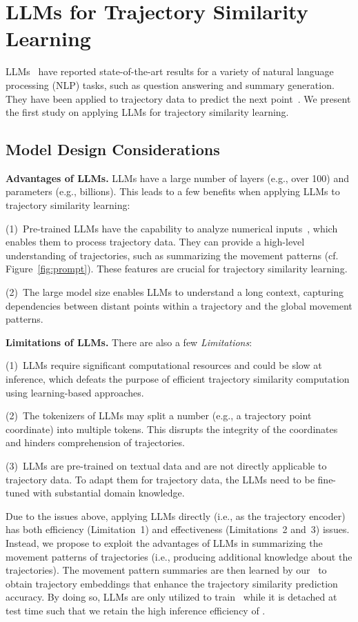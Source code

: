 \section{LLMs for Trajectory Similarity Learning}\label{sec:llm}
LLMs~\cite{gpt4,llama2,gemini,llama1} have reported state-of-the-art results for a variety of natural language processing (NLP) tasks, such as question answering and summary generation. They have been applied to trajectory data to predict the next point~\cite{llm4poi,trajllm}. We present the first study on applying LLMs for trajectory similarity learning.



\subsection{Model Design Considerations}\label{subsec:llm_discussion}
\textbf{Advantages of LLMs.} LLMs have a large number of layers (e.g., over 100) and parameters (e.g., billions). 
This leads to a few benefits when applying LLMs to trajectory similarity learning:
 
(1)~Pre-trained LLMs have the capability to analyze numerical inputs~\cite{timellm,lagllama}, which enables them to process trajectory data. They can provide a high-level understanding of trajectories, such as summarizing the movement patterns (cf. Figure~\ref{fig:prompt}). These features are crucial for trajectory similarity learning.

(2)~The large model size enables LLMs to understand a long context,  capturing dependencies between distant points within a trajectory and the global movement patterns.


\textbf{Limitations of LLMs.} There are also a few \emph{Limitations}:

(1)~LLMs require significant computational resources and could be slow at inference, which defeats the purpose of efficient trajectory similarity computation using learning-based approaches. 

(2)~The tokenizers of LLMs may split a number (e.g., a trajectory point coordinate) into multiple tokens. This disrupts the integrity of the coordinates and hinders  comprehension of trajectories.
 
(3)~LLMs are pre-trained on textual data and are not directly applicable to trajectory data. 
To adapt them for trajectory data, the LLMs need to be fine-tuned with substantial domain knowledge.

Due to the issues above, applying LLMs directly (i.e., as the trajectory encoder) has both efficiency (Limitation~1) and effectiveness (Limitations~2 and~3) issues. Instead, we propose to exploit the advantages of LLMs in summarizing the movement patterns of trajectories (i.e., producing additional knowledge about the trajectories). The movement pattern summaries are then learned by our \model\ to obtain trajectory embeddings that enhance the trajectory similarity prediction accuracy. 
By doing so, LLMs are only utilized to train \model\ while it is detached at test time such that we retain the high inference efficiency of \model. 


